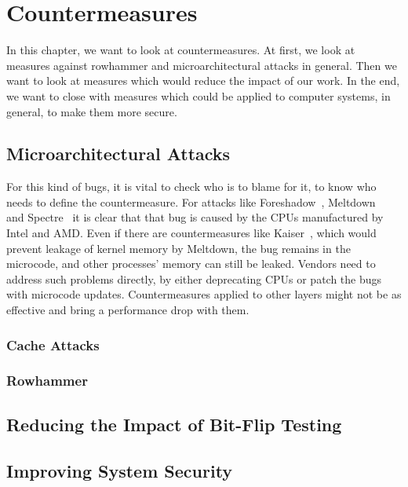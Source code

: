 \chapter{Countermeasures}\label{sec:countermeasure}

In this chapter, we want to look at countermeasures. At first, we look at
measures against rowhammer and microarchitectural attacks in general. Then we
want to look at measures which would reduce the impact of our work. In the end,
we want to close with measures which could be applied to computer systems, in
general, to make them more secure.

\section{Microarchitectural Attacks}

For this kind of bugs, it is vital to check who is to blame for it, to know who
needs to define the countermeasure. For attacks like
Foreshadow~\cite{foreshadow}, Meltdown~\cite{meltdown} and
Spectre~\cite{spectre} it is clear that that bug is caused by the CPUs
manufactured by Intel and AMD. Even if there are countermeasures like
Kaiser~\cite{kaiserpaper}, which would prevent leakage of kernel memory by
Meltdown, the bug remains in the microcode, and other processes' memory can
still be leaked. Vendors need to address such problems directly, by either
deprecating CPUs or patch the bugs with microcode updates. Countermeasures
applied to other layers might not be as effective and bring a performance drop
with them.

\subsection{Cache Attacks}

\subsection{Rowhammer}

\section{Reducing the Impact of Bit-Flip Testing}

\section{Improving System Security}

